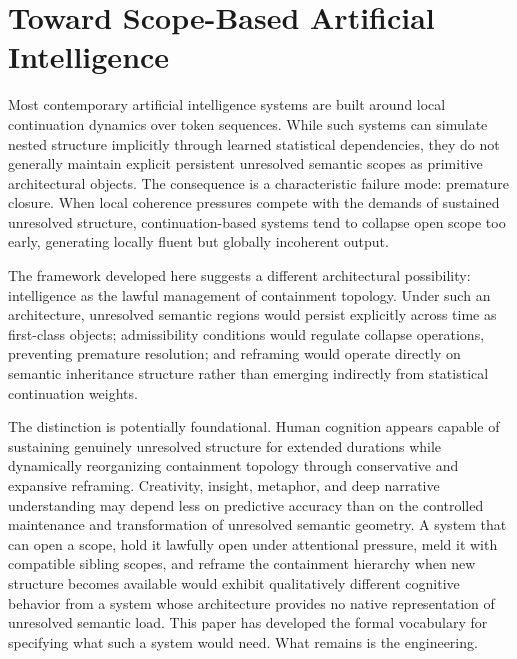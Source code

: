 \documentclass[12pt, a4paper]{article}
\theoremstyle{plain}
\theoremstyle{definition}
\theoremstyle{remark}
\begin{document}
\section{Toward Scope-Based Artificial Intelligence}

Most contemporary artificial intelligence systems are built around local
continuation dynamics over token sequences. While such systems can simulate
nested structure implicitly through learned statistical dependencies, they do
not generally maintain explicit persistent unresolved semantic scopes as
primitive architectural objects. The consequence is a characteristic
failure mode: premature closure. When local coherence pressures compete with
the demands of sustained unresolved structure, continuation-based systems tend
to collapse open scope too early, generating locally fluent but globally
incoherent output.

The framework developed here suggests a different architectural possibility:
intelligence as the lawful management of containment topology. Under such an
architecture, unresolved semantic regions would persist explicitly across
time as first-class objects; admissibility conditions would regulate collapse
operations, preventing premature resolution; and reframing would operate
directly on semantic inheritance structure rather than emerging indirectly from
statistical continuation weights.

The distinction is potentially foundational. Human cognition appears capable
of sustaining genuinely unresolved structure for extended durations while
dynamically reorganizing containment topology through conservative and
expansive reframing. Creativity, insight, metaphor, and deep narrative
understanding may depend less on predictive accuracy than on the controlled
maintenance and transformation of unresolved semantic geometry. A system that
can open a scope, hold it lawfully open under attentional pressure, meld it
with compatible sibling scopes, and reframe the containment hierarchy when
new structure becomes available would exhibit qualitatively different cognitive
behavior from a system whose architecture provides no native representation of
unresolved semantic load. This paper has developed the formal vocabulary for
specifying what such a system would need. What remains is the engineering.
\end{document}
